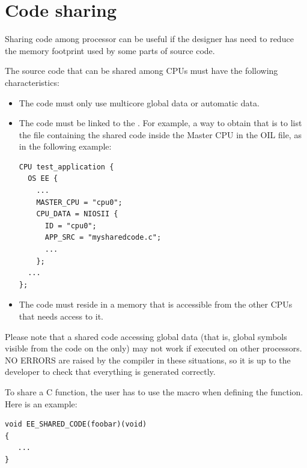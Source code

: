 \section{Code sharing}

Sharing code among processor can be useful if the designer has need to
reduce the memory footprint used by some parts of source code.

The source code that can be shared among CPUs must have the following
characteristics:

\begin{itemize}

\item The code must only use multicore global data or automatic
  data.


\item The code must be linked to the . For example,
a way to obtain that is to list the file containing the shared code
inside the Master CPU in the OIL file, as in the following example:

\begin{lstlisting}
CPU test_application {
  OS EE {
    ...
    MASTER_CPU = "cpu0";			
    CPU_DATA = NIOSII {
      ID = "cpu0";
      APP_SRC = "mysharedcode.c";
      ...
    };
  ...
};
\end{lstlisting}



\item The code must reside in a memory that is accessible from the
  other CPUs that needs access to it.

\end{itemize}

\begin{warning}
Please note that a shared code accessing global data (that is, global
symbols visible from the code on the  only) may not
work if executed on other processors. NO ERRORS are raised by the
compiler in these situations, so it is up to the developer to check
that everything is generated correctly.
\end{warning}

To share a C function, the user has to use the 
macro when defining the function. Here is an example:

\begin{lstlisting}
void EE_SHARED_CODE(foobar)(void) 
{ 
   ...  
}
\end{lstlisting}






